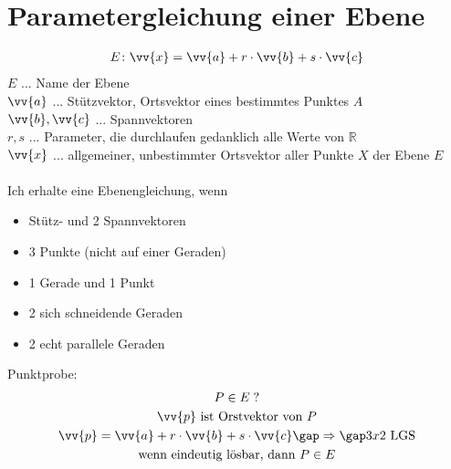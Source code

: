 \section{Parametergleichung einer Ebene}
\begin{gather*}
  E \colon \vv{x} = \vv{a} + r \cdot \vv{b} + s \cdot \vv{c}
\end{gather*}
$E$ ... Name der Ebene \\
$\vv{a}$ ... Stützvektor, Ortsvektor eines bestimmtes Punktes $A$ \\
$\vv{b}, \vv{c}$ ... Spannvektoren \\
$r, s$ ... Parameter, die durchlaufen gedanklich alle Werte von $\mathbb{R}$ \\
$\vv{x}$ ... allgemeiner, unbestimmter Ortsvektor aller Punkte $X$ der Ebene $E$ \\\\
Ich erhalte eine Ebenengleichung, wenn
\begin{itemize}
  \item Stütz- und 2 Spannvektoren
  \item 3 Punkte (nicht auf einer Geraden)
  \item 1 Gerade und 1 Punkt
  \item 2 sich schneidende Geraden
  \item 2 echt parallele Geraden
\end{itemize}
Punktprobe:
\begin{gather*}
  P \in E \; ? \\
  \text{$\vv{p}$ ist Orstvektor von $P$} \\
  \vv{p} = \vv{a} + r \cdot \vv{b} + s \cdot \vv{c} \gap\Rightarrow\gap \text{$3x2$ LGS} \\
  \text{wenn eindeutig lösbar, dann $P \in E$}
\end{gather*}
